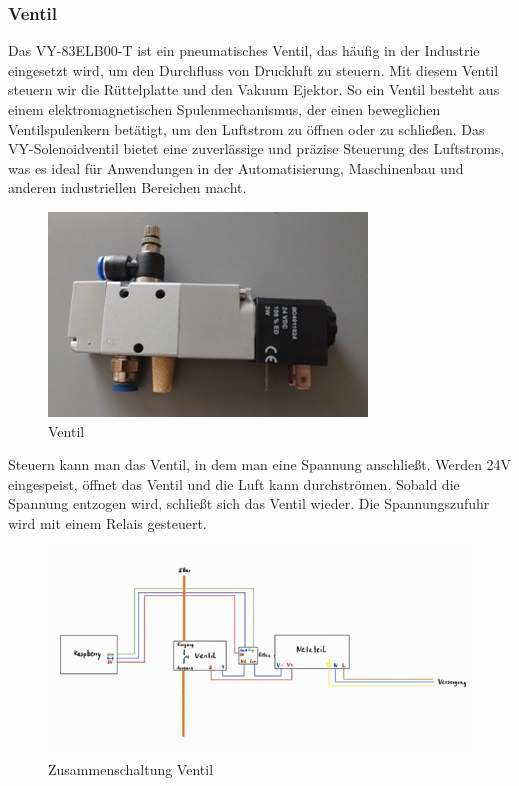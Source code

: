 \subsubsection{Ventil}
Das VY-83ELB00-T\autocite{Ventil} ist ein pneumatisches Ventil, das häufig in der Industrie eingesetzt wird, um den Durchfluss von Druckluft zu steuern. Mit diesem Ventil steuern wir die Rüttelplatte und den Vakuum Ejektor. So ein Ventil besteht aus einem elektromagnetischen Spulenmechanismus, der einen beweglichen Ventilspulenkern betätigt, um den Luftstrom zu öffnen oder zu schließen. Das VY-Solenoidventil bietet eine zuverlässige und präzise Steuerung des Luftstroms, was es ideal für Anwendungen in der Automatisierung, Maschinenbau und anderen industriellen Bereichen macht.\\
\vspace{3mm}
\begin{figure}[H]
    \centering
    \includegraphics{image/ventil.jpeg}
    \caption{Ventil}
    \label{fig:enter-label}
\end{figure}
\vspace{3mm}
Steuern kann man das Ventil, in dem man eine Spannung anschließt. Werden 24V eingespeist, öffnet das Ventil und die Luft kann durchströmen. Sobald die Spannung entzogen wird, schließt sich das Ventil wieder. Die Spannungszufuhr wird mit einem Relais gesteuert.
\begin{figure}[H]
    \centering
    \includegraphics[scale=1.1]{image/zusammenschaltngventil.jpeg}
    \caption{Zusammenschaltung Ventil}
    \label{fig:enter-label}
\end{figure}

